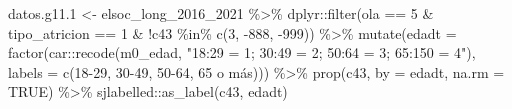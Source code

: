\documentclass[
  12pt,
]{book}
\newenvironment{Shaded}{\begin{snugshade}}{\end{snugshade}}
\newcommand{\AttributeTok}[1]{\textcolor[rgb]{0.77,0.63,0.00}{#1}}
\newcommand{\ConstantTok}[1]{\textcolor[rgb]{0.00,0.00,0.00}{#1}}
\newcommand{\DecValTok}[1]{\textcolor[rgb]{0.00,0.00,0.81}{#1}}
\newcommand{\FloatTok}[1]{\textcolor[rgb]{0.00,0.00,0.81}{#1}}
\newcommand{\FunctionTok}[1]{\textcolor[rgb]{0.00,0.00,0.00}{#1}}
\newcommand{\NormalTok}[1]{#1}
\newcommand{\OtherTok}[1]{\textcolor[rgb]{0.56,0.35,0.01}{#1}}
\newcommand{\SpecialCharTok}[1]{\textcolor[rgb]{0.00,0.00,0.00}{#1}}
\newcommand{\StringTok}[1]{\textcolor[rgb]{0.31,0.60,0.02}{#1}}
\begin{document}
\begin{Shaded}
\begin{Highlighting}[]
\NormalTok{datos.g11}\FloatTok{.1} \OtherTok{\textless{}{-}}\NormalTok{ elsoc\_long\_2016\_2021 }\SpecialCharTok{\%\textgreater{}\%} 
\NormalTok{  dplyr}\SpecialCharTok{::}\FunctionTok{filter}\NormalTok{(ola }\SpecialCharTok{==} \DecValTok{5} \SpecialCharTok{\&}\NormalTok{ tipo\_atricion }\SpecialCharTok{==} \DecValTok{1} \SpecialCharTok{\&} \SpecialCharTok{!}\NormalTok{c43 }\SpecialCharTok{\%in\%} \FunctionTok{c}\NormalTok{(}\DecValTok{3}\NormalTok{, }\SpecialCharTok{{-}}\DecValTok{888}\NormalTok{, }\SpecialCharTok{{-}}\DecValTok{999}\NormalTok{)) }\SpecialCharTok{\%\textgreater{}\%} 
  \FunctionTok{mutate}\NormalTok{(}\AttributeTok{edadt =} \FunctionTok{factor}\NormalTok{(car}\SpecialCharTok{::}\FunctionTok{recode}\NormalTok{(m0\_edad, }\StringTok{"18:29 = 1; 30:49 = 2; 50:64 = 3; 65:150 = 4"}\NormalTok{),}
                           \AttributeTok{labels =} \FunctionTok{c}\NormalTok{(}\StringTok{\textquotesingle{}18{-}29\textquotesingle{}}\NormalTok{, }\StringTok{\textquotesingle{}30{-}49\textquotesingle{}}\NormalTok{, }\StringTok{\textquotesingle{}50{-}64\textquotesingle{}}\NormalTok{, }\StringTok{\textquotesingle{}65 o más\textquotesingle{}}\NormalTok{))) }\SpecialCharTok{\%\textgreater{}\%}
  \FunctionTok{prop}\NormalTok{(c43, }\AttributeTok{by =}\NormalTok{ edadt, }\AttributeTok{na.rm =} \ConstantTok{TRUE}\NormalTok{) }\SpecialCharTok{\%\textgreater{}\%} 
\NormalTok{  sjlabelled}\SpecialCharTok{::}\FunctionTok{as\_label}\NormalTok{(c43, edadt)}
  

\end{Highlighting}
\end{Shaded}
\end{document}
